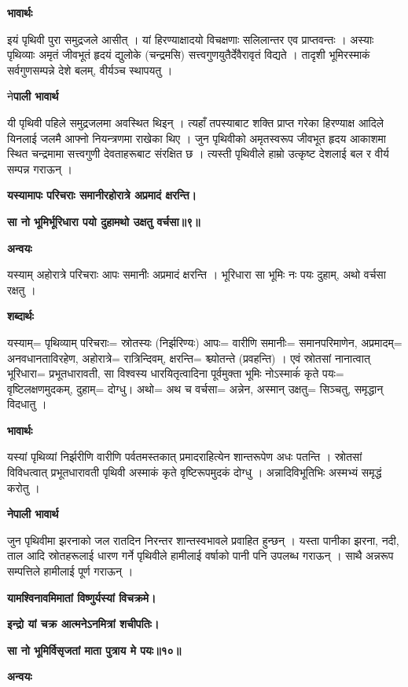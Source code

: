 \documentclass[11pt, a5paper]{article}
\begin{document}
\textbf{भावार्थः}

इयं पृथिवी पुरा समुद्रजले आसीत् । यां हिरण्याक्षादयो विचक्षणाः सलिलान्तर एव प्राप्तवन्तः । अस्याः पृथिव्याः अमृतं जीवभूतं हृदयं द्युलोके (चन्द्रमसि) सत्त्वगुणयुतैर्देवैरावृतं विद्यते । तादृशी भूमिरस्माकं सर्वगुणसम्पन्ने देशे बलम्, वीर्यञ्च स्थापयतु ।

ने\textbf{पाली भावार्थ}

यी पृथिवी पहिले समुद्रजलमा अवस्थित थिइन् । त्यहाँ तपस्याबाट शक्ति प्राप्त गरेका हिरण्याक्ष आदिले यिनलाई जलमै आफ्नो नियन्त्रणमा राखेका थिए । जुन पृथिवीको अमृतस्वरूप जीवभूत हृदय आकाशमा स्थित चन्द्रमामा सत्त्वगुणी देवताहरूबाट संरक्षित छ । त्यस्ती पृथिवीले हाम्रो उत्कृष्ट देशलाई बल र वीर्य सम्पन्न गराऊन् ।

\textbf{यस्यामापः परिचराः समानीरहोरात्रे अप्रमादं क्षरन्ति।}

\textbf{सा नो भूमिर्भूरिधारा पयो दुहामथो उक्षतु वर्चसा॥९॥}

\textbf{अन्वयः}

यस्याम् अहोरात्रे परिचराः आपः समानीः अप्रमादं क्षरन्ति । भूरिधारा सा भूमिः नः पयः दुहाम्, अथो वर्चसा रक्षतु ।

\textbf{शब्दार्थः}

यस्याम्= पृथिव्याम् परिचराः= स्रोतस्यः (निर्झरिण्यः) आपः= वारीणि समानीः= समानपरिमाणेन, अप्रमादम्= अनवधानताविरहेण, अहोरात्रे= रात्रिन्दिवम्, क्षरन्ति= श्च्योतन्ते (प्रवहन्ति) । एवं स्रोतसां नानात्वात् भूरिधारा= प्रभूतधारावती, सा विश्वस्य धारयितृत्वादिना पूर्वमुक्ता भूमिः नोऽस्माकंं कृते पयः= वृष्टिलक्षणमुदकम्, दुहाम्= दोग्धु। अथो= अथ च वर्चसा= अन्नेन, अस्मान् उक्षतु= सिञ्चतु, समृद्धान् विदधातु ।

\textbf{भावार्थः}

यस्यां पृथिव्यां  निर्झरीणि वारीणि पर्वतमस्तकात् प्रमादराहित्येन शान्तरूपेण अधः पतन्ति । स्रोतसां विविधत्वात् प्रभूतधारावती पृथिवी अस्माकं कृते वृष्टिरूपमुदकं दोग्धु । अन्नादिविभूतिभिः अस्मभ्यं समृद्धं करोतु ।

\textbf{नेपाली भावार्थ}

जुन पृथिवीमा झरनाको जल रातदिन निरन्तर शान्तस्वभावले प्रवाहित हुन्छन्  । यस्ता पानीका झरना, नदी, ताल आदि स्रोतहरूलाई धारण गर्ने पृथिवीले हामीलाई वर्षाको पानी पनि उपलब्ध गराऊन् । साथै अन्नरूप सम्पत्तिले हामीलाई पूर्ण गराऊन् ।

\textbf{यामश्विनावमिमातां विष्णुर्यस्यां विचक्रमे।}

\textbf{इन्द्रो यां चक्र आत्मनेऽनमित्रां शचीपतिः।}

\textbf{सा नो भूमिर्विसृजतां माता पुत्राय मे पयः॥१०॥}

\textbf{अन्वयः}
\end{document}
